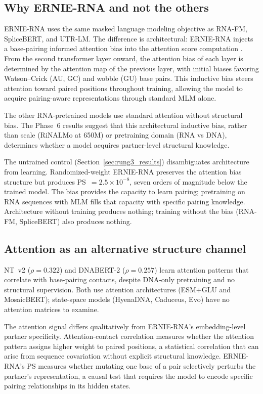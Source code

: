\documentclass[11pt]{article}
\begin{document}
\subsection{Why ERNIE-RNA and not the others}
\label{sec:why_ernierna}

ERNIE-RNA uses the same masked language modeling objective as RNA-FM,
SpliceBERT, and UTR-LM.  The difference is architectural: ERNIE-RNA
injects a base-pairing informed attention bias into the attention
score computation \citep{yin2024ernierna}.  From the second
transformer layer onward, the attention bias of each layer is
determined by the attention map of the previous layer, with initial
biases favoring Watson--Crick (AU, GC) and wobble (GU) base pairs.
This inductive bias steers attention toward paired positions
throughout training, allowing the model to acquire pairing-aware
representations through standard MLM alone.

The other RNA-pretrained models use standard attention without
structural bias.  The Phase~6 results suggest that this architectural
inductive bias, rather than scale (RiNALMo at 650M) or pretraining
domain (RNA vs DNA), determines whether a model acquires
partner-level structural knowledge.

The untrained control (Section~\ref{sec:rung3_results}) disambiguates
architecture from learning.  Randomized-weight ERNIE-RNA preserves
the attention bias structure but produces PS~$= 2.5 \times 10^{-8}$,
seven orders of magnitude below the trained model.  The bias provides
the capacity to learn pairing; pretraining on RNA sequences with MLM
fills that capacity with specific pairing knowledge.  Architecture
without training produces nothing; training without the bias (RNA-FM,
SpliceBERT) also produces nothing.

\subsection{Attention as an alternative structure channel}
\label{sec:attention_channel}

NT~v2 ($\rho = 0.322$) and DNABERT-2 ($\rho = 0.257$) learn
attention patterns that correlate with base-pairing contacts, despite
DNA-only pretraining and no structural supervision.  Both use
attention architectures (ESM+GLU and MosaicBERT); state-space models
(HyenaDNA, Caduceus, Evo) have no attention matrices to examine.

The attention signal differs qualitatively from ERNIE-RNA's
embedding-level partner specificity.  Attention-contact correlation
measures whether the attention pattern assigns higher weight to paired
positions, a statistical correlation that can arise from sequence
covariation without explicit structural knowledge.  ERNIE-RNA's PS
measures whether mutating one base of a pair selectively perturbs the
partner's representation, a causal test that requires the model to
encode specific pairing relationships in its hidden states.
\end{document}
